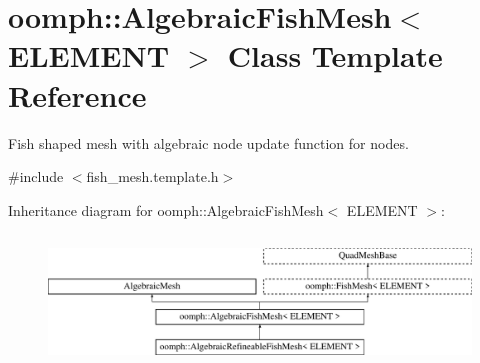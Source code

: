 \hypertarget{classoomph_1_1AlgebraicFishMesh}{}\section{oomph\+:\+:Algebraic\+Fish\+Mesh$<$ E\+L\+E\+M\+E\+NT $>$ Class Template Reference}
\label{classoomph_1_1AlgebraicFishMesh}


Fish shaped mesh with algebraic node update function for nodes.  




{\ttfamily \#include $<$fish\+\_\+mesh.\+template.\+h$>$}

Inheritance diagram for oomph\+:\+:Algebraic\+Fish\+Mesh$<$ E\+L\+E\+M\+E\+NT $>$\+:\begin{figure}[H]
\begin{center}
\leavevmode
\includegraphics[height=3.555556cm]{classoomph_1_1AlgebraicFishMesh}
\end{center}
\end{figure}
